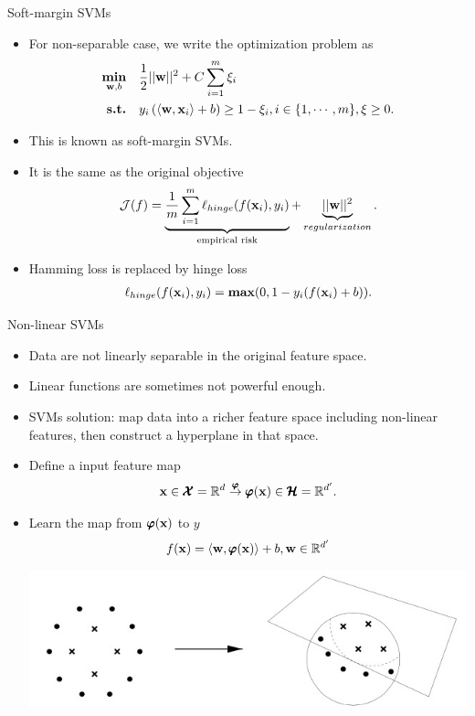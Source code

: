 \documentclass[first=dgreen,second=purple,logo=yellowexc]{aaltoslides}
\begin{document}
{\begin{frame}{Soft-margin SVMs}
	\begin{itemize}
		\item For non-separable case, we write the optimization problem as
		\begin{align*}
			\underset{\mathbf {w},b}{\textbf{min}} &\quad \frac{1}{2} ||\mathbf {w}||^2 + C\sum_{i=1}^m\xi_i\\
            \textbf{s.t.} &\quad y_i\,(\langle \mathbf {w}, \mathbf {x}_i \rangle + b) \ge 1-\xi_i, i\in\{1,\cdots,m\}, \xi\ge0.
		\end{align*}
		\item This is known as soft-margin SVMs.
		\item It is the same as the original objective
		\begin{align*}
			\mathcal{J}(f) = \underbrace{\frac{1}{m}\sum_{i=1}^{m}\ell_{hinge}(f(\mathbf {x}_i),y_i)}_{\text{empirical risk}} + \underbrace{||\mathbf {w}||^2}_{regularization}.
		\end{align*}
		\item Hamming loss is replaced by hinge loss
		\begin{align*}
			\ell_{hinge}(f(\mathbf {x}_i),y_i) = \textbf{max}(0, 1-y_i(f(\mathbf {x}_i)+b)).
		\end{align*}
	\end{itemize}
\end{frame}

\begin{frame}{Non-linear SVMs}
	\begin{itemize}
		\item Data are not linearly separable in the original feature space.
		\item Linear functions are sometimes not powerful enough.
		\item SVMs solution: map data into a richer feature space including non-linear features, then construct a hyperplane in that space.
		\item Define a input feature map
		\begin{align*}
			\mathbf {x}\in\pmb {\mathcal{X}}=\mathbb{R}^d\overset{\pmb \varphi}{\rightarrow}\pmb \varphi(\mathbf {x})\in\pmb {\mathcal{H}} =\mathbb{R}^{d'}.
		\end{align*}
		\item Learn the map from $\pmb \varphi(\mathbf {x})$ to $y$
		\begin{align*}
			f(\mathbf {x}) = \langle \mathbf {w}, \pmb \varphi(\mathbf {x}) \rangle + b, \mathbf {w}\in\mathbb{R}^{d'}
		\end{align*}
		\begin{center}
			\includegraphics[scale=0.3]{./figures/nonlinearsvm.jpg}
		\end{center}
	\end{itemize}
\end{frame}


}
\end{document}
